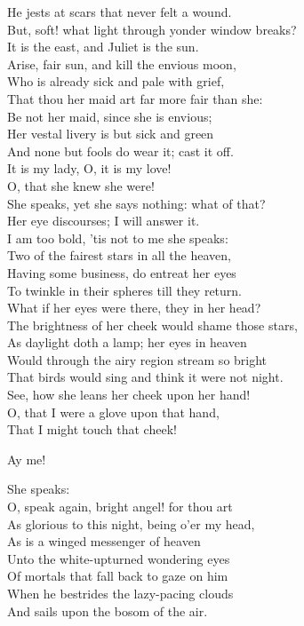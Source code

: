  
\begin{speech}
He jests at scars that never felt a wound. 
\\
But, soft!  what light through yonder window breaks? \\
It is the east, and Juliet is the sun. \\
Arise, fair sun, and kill the envious moon, \\
Who is already sick and pale with grief, \\
That thou her maid art far more fair than she: \\
Be not her maid, since she is envious; \\
Her vestal livery is but sick and green \\
And none but fools do wear it; cast it off. \\
It is my lady, O, it is my love! \\
O, that she knew she were! \\
She speaks, yet she says nothing:   what of that? \\
Her eye discourses; I will answer it. \\
I am too bold, 'tis not to me she speaks: \\
Two of the fairest stars in all the heaven, \\
Having some business, do entreat her eyes \\
To twinkle in their spheres till they return. \\
What if her eyes were there, they in her head? \\
The brightness of her cheek would shame those stars, \\
As daylight doth a lamp; her eyes in heaven \\
Would through the airy region stream so bright \\
That birds would sing and think it were not night. \\
See, how she leans her cheek upon her hand! \\
O, that I were a glove upon that hand, \\
That I might touch that cheek! \\
\end{speech}
\begin{speech}
Ay me! \\
\end{speech}
\begin{speech}
She speaks: \\
O, speak again, bright angel! for thou art \\
As glorious to this night, being o'er my head, \\
As is a winged messenger of heaven \\
Unto the white-upturned wondering eyes \\
Of mortals that fall back to gaze on him \\
When he bestrides the lazy-pacing clouds \\
And sails upon the bosom of the air. \\
\end{speech}
